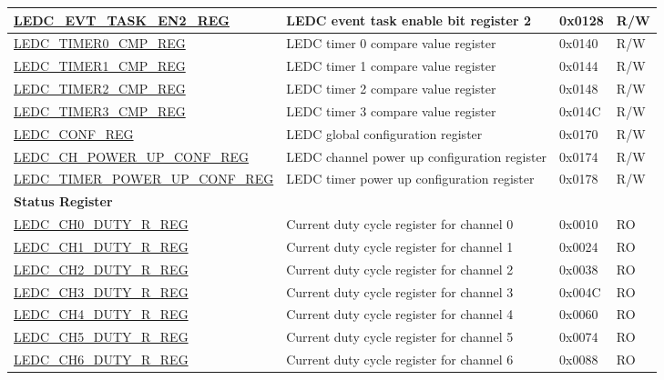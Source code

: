 \begin{longtable}{ | p{6cm} | p{7cm} | p{1.3cm} | p{1.7cm}| }
\hyperref[regdesc:LEDCEVTTASKEN2REG]{LEDC\_EVT\_TASK\_EN2\_REG} & LEDC event task enable bit register 2 & 0x0128 & R/W \\ \hline
\hyperref[regdesc:LEDCTIMERXCMPREG]{LEDC\_TIMER0\_CMP\_REG} & LEDC timer 0 compare value register & 0x0140 & R/W \\ \hline
\hyperref[regdesc:LEDCTIMERXCMPREG]{LEDC\_TIMER1\_CMP\_REG} & LEDC timer 1 compare value register & 0x0144 & R/W \\ \hline
\hyperref[regdesc:LEDCTIMERXCMPREG]{LEDC\_TIMER2\_CMP\_REG} & LEDC timer 2 compare value register & 0x0148 & R/W \\ \hline
\hyperref[regdesc:LEDCTIMERXCMPREG]{LEDC\_TIMER3\_CMP\_REG} & LEDC timer 3 compare value register & 0x014C & R/W \\ \hline
\hyperref[regdesc:LEDCCONFREG]{LEDC\_CONF\_REG} & LEDC global configuration register & 0x0170 & R/W \\ \hline
\hyperref[regdesc:LEDCCHPOWERUPCONFREG]{LEDC\_CH\_POWER\_UP\_CONF\_REG} & LEDC channel power up configuration register & 0x0174 & R/W \\ \hline
\hyperref[regdesc:LEDCTIMERPOWERUPCONFREG]{LEDC\_TIMER\_POWER\_UP\_CONF\_REG} & LEDC timer power up configuration register & 0x0178 & R/W \\ \hline
\multicolumn{4}{|l|}{\textbf{Status Register}} \\ \hline
\hyperref[regdesc:LEDCCHNDUTYRREG]{LEDC\_CH0\_DUTY\_R\_REG} & Current duty cycle register for channel 0 & 0x0010 & RO \\ \hline
\hyperref[regdesc:LEDCCHNDUTYRREG]{LEDC\_CH1\_DUTY\_R\_REG} & Current duty cycle register for channel 1 & 0x0024 & RO \\ \hline
\hyperref[regdesc:LEDCCHNDUTYRREG]{LEDC\_CH2\_DUTY\_R\_REG} & Current duty cycle register for channel 2 & 0x0038 & RO \\ \hline
\hyperref[regdesc:LEDCCHNDUTYRREG]{LEDC\_CH3\_DUTY\_R\_REG} & Current duty cycle register for channel 3 & 0x004C & RO \\ \hline
\hyperref[regdesc:LEDCCHNDUTYRREG]{LEDC\_CH4\_DUTY\_R\_REG} & Current duty cycle register for channel 4 & 0x0060 & RO \\ \hline
\hyperref[regdesc:LEDCCHNDUTYRREG]{LEDC\_CH5\_DUTY\_R\_REG} & Current duty cycle register for channel 5 & 0x0074 & RO \\ \hline
\hyperref[regdesc:LEDCCHNDUTYRREG]{LEDC\_CH6\_DUTY\_R\_REG} & Current duty cycle register for channel 6 & 0x0088 & RO \\ \hline

\end{longtable}

